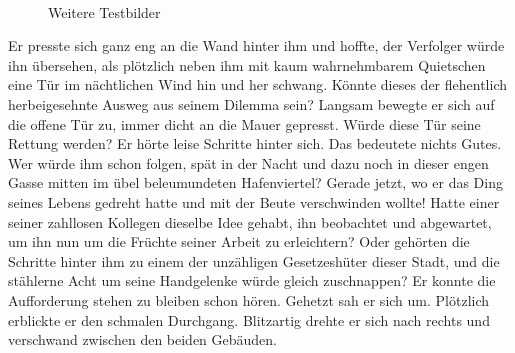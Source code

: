 \begin{figure}[t]
{    }
    \hspace{1.5cm}%
    \\
    \caption[Weitere Testbilder]{Weitere Testbilder}
        \label{fig_testbild2}
    \end{figure}

Er presste sich ganz eng an die Wand hinter ihm und hoffte, der
Verfolger würde ihn übersehen, als plötzlich neben ihm mit kaum
wahrnehmbarem Quietschen eine Tür im nächtlichen Wind hin und her
schwang. Könnte dieses der flehentlich herbeigesehnte Ausweg aus
seinem Dilemma sein? Langsam bewegte er sich auf die offene Tür
zu, immer dicht an die Mauer gepresst. Würde diese Tür seine
Rettung werden? Er hörte leise Schritte hinter sich. Das bedeutete
nichts Gutes. Wer würde ihm schon folgen, spät in der Nacht und
dazu noch in dieser engen Gasse mitten im übel beleumundeten
Hafenviertel? Gerade jetzt, wo er das Ding seines Lebens gedreht
hatte und mit der Beute verschwinden wollte! Hatte einer seiner
zahllosen Kollegen dieselbe Idee gehabt, ihn beobachtet und
abgewartet, um ihn nun um die Früchte seiner Arbeit zu
erleichtern? Oder gehörten die Schritte hinter ihm zu einem der
unzähligen Gesetzeshüter dieser Stadt, und die stählerne Acht um
seine Handgelenke würde gleich zuschnappen? Er konnte die
Aufforderung stehen zu bleiben schon hören. Gehetzt sah er sich
um. Plötzlich erblickte er den schmalen Durchgang. Blitzartig
drehte er sich nach rechts und verschwand zwischen den beiden
Gebäuden.

